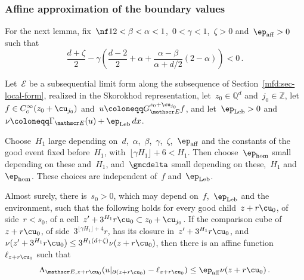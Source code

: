 \documentclass[11pt]{amsart}
\begin{document}
\subsubsection{Affine approximation of the boundary values}

For the next lemma, fix~$\nf12<\beta<\alpha<1$,~$0<\gamma<1$,~$\zeta>0$ and~$\ep_{\rm aff}>0$ such that
\begin{equation}
	\frac{d+\zeta}{2}
	-\gamma\left(\frac{d-2}{2}+\alpha
	+\frac{\alpha-\beta}{\alpha+d/2}(2-\alpha)\right)<0\,.
	\label{eq:mfd-33}
\end{equation}

Let~$\mathscr E$ be a subsequential limit form along the subsequence of Section~\ref{mfd:sec-local-form}, realized in the Skorokhod representation, let~$z_0\in\mathbb Q^d$ and~$j_0\in\mathbb Z$, let~$f\in C_c^\infty(z_0+\cu_{j_0})$ and~$u\coloneqq G_{\mathscr E}^{z_0+\cu_{j_0}}f$, and let~$\ep_{\rm Leb}>0$ and~$\nu\coloneqq\Gamma_{\mathscr E}(u)+\ep_{\rm Leb}\,dx$.

Choose~$H_1$ large depending on~$d$,~$\alpha$,~$\beta$,~$\gamma$,~$\zeta$,~$\ep_{\rm aff}$ and the constants of the good event fixed before~$H_1$, with~$\lfloor\gamma H_1\rfloor+6<H_1$. Then choose~$\ep_{\rm hom}$ small depending on these and~$H_1$, and~$\gmcdelta$ small depending on these,~$H_1$ and~$\ep_{\rm hom}$. These choices are independent of~$f$ and~$\ep_{\rm Leb}$.

\begin{lemma}
\label{mfd:lem-affine}
Almost surely, there is~$s_0>0$, which may depend on~$f$,~$\ep_{\rm Leb}$ and the environment, such that the following holds for every good child~$z+r\cu_0$, of side~$r<s_0$, of a cell~$z'+3^{H_1}r\cu_0\subset z_0+\cu_{j_0}$. If the comparison cube of~$z+r\cu_0$, of side~$3^{\lfloor\gamma H_1\rfloor+4}r$, has its closure in~$z'+3^{H_1}r\cu_0$, and~$\nu(z'+3^{H_1}r\cu_0)\leq3^{H_1(d+\zeta)}\nu(z+r\cu_0)$, then there is an affine function~$\ell_{z+r\cu_0}$ such that
\begin{equation}
	\Lambda_{\mathscr E,z+r\cu_0}(u|_{\partial(z+r\cu_0)}-\ell_{z+r\cu_0})\leq\ep_{\rm aff}\nu(z+r\cu_0)\,.
	\label{eq:mfd-34}
\end{equation}
\end{lemma}
\end{document}
